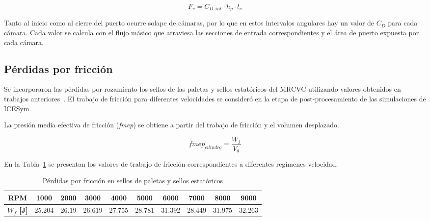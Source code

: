 \begin{equation}\label{eq:fv}
    F_v = C_{D,int}\cdot h_{p}\cdot l_{v}
\end{equation}


Tanto al inicio como al cierre del puerto ocurre solape de cámaras, por lo que
en estos intervalos angulares hay un valor de $C_D$ para cada cámara.
%
Cada valor se calcula con el flujo másico que atraviesa las secciones de entrada
correspondientes y el área de puerto expuesta por cada cámara.

\subsection{Pérdidas por fricción}

Se incorporaron las pérdidas por rozamiento los sellos de las paletas y sellos
estatóricos del MRCVC utilizando valores obtenidos en trabajos
anteriores~\parencite{roldan}.
%
El trabajo de fricción para diferentes velocidades se consideró en la etapa de
post-procesamiento de las simulaciones de ICESym.

La presión media efectiva de fricción (\textit{fmep}) se obtiene a partir del
trabajo de fricción y el volumen desplazado.

\begin{equation}
  fmep_{cilindro} = \frac{W_{f}}{V_{d}}
\end{equation}

En la Tabla~\ref{tab:trabajo_fricción} se presentan los valores de trabajo de
fricción correspondientes a diferentes regímenes velocidad.

\begin{table}[h!]
  \centering
  \begin{tabular}{cccccccccc}
    \toprule
    \textbf{RPM} & 1000 & 2000 & 3000 & 4000 & 5000 & 6000 & 7000 & 8000 & 9000 \\
    \midrule
    \textbf{$W_{f}$ [J]} & 25.204 & 26.19 & 26.619 & 27.755 & 28.781 & 31.392 & 28.449 & 31.975 & 32.263 \\
    \bottomrule
  \end{tabular}
  \caption{Pérdidas por fricción en sellos de paletas y sellos estatóricos}\label{tab:trabajo_fricción}
\end{table}


